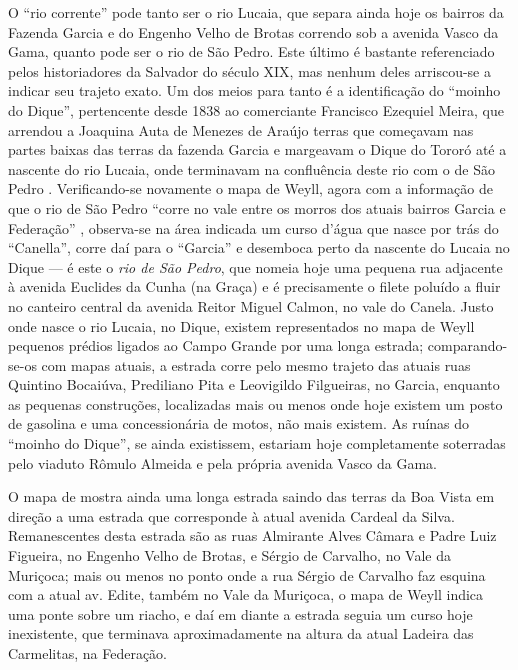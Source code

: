 O ``rio corrente'' pode tanto ser o rio Lucaia, que separa ainda hoje os bairros da Fazenda Garcia e do Engenho Velho de Brotas correndo sob a avenida Vasco da Gama, quanto pode ser o rio de São Pedro. Este último é bastante referenciado pelos historiadores da Salvador do século XIX, mas nenhum deles arriscou-se a indicar seu trajeto exato. Um dos meios para tanto é a identificação do ``moinho do Dique'', pertencente desde 1838 ao comerciante Francisco Ezequiel Meira, que arrendou a Joaquina Auta de Menezes de Araújo terras que começavam nas partes baixas das terras da fazenda Garcia e margeavam o Dique do Tororó até a nascente do rio Lucaia, onde terminavam na confluência deste rio com o de São Pedro \cite[p.~38]{CASTILLO2017}. Verificando-se novamente o mapa de Weyll, agora com a informação de que o rio de São Pedro ``corre no vale entre os morros dos atuais bairros Garcia e Federação'' \cite[p.~39]{CASTILLO2017}, observa-se na área indicada um curso d'água que nasce por trás do ``Canella'', corre daí para o ``Garcia'' e desemboca perto da nascente do Lucaia no Dique --- é este o \textit{rio de São Pedro}, que nomeia hoje uma pequena rua adjacente à avenida Euclides da Cunha (na Graça) e é precisamente o filete poluído a fluir no canteiro central da avenida Reitor Miguel Calmon, no vale do Canela. Justo onde nasce o rio Lucaia, no Dique, existem representados no mapa de Weyll pequenos prédios ligados ao Campo Grande por uma longa estrada; comparando-se-os com mapas atuais, a estrada corre pelo mesmo trajeto das atuais ruas Quintino Bocaiúva, Prediliano Pita e Leovigildo Filgueiras, no Garcia, enquanto as pequenas construções, localizadas mais ou menos onde hoje existem um posto de gasolina e uma concessionária de motos, não mais existem. As ruínas do ``moinho do Dique'', se ainda existissem, estariam hoje completamente soterradas pelo viaduto Rômulo Almeida e pela própria avenida Vasco da Gama.

O mapa de  mostra ainda uma longa estrada saindo das terras da Boa Vista em direção a uma estrada que corresponde à atual avenida Cardeal da Silva. Remanescentes desta estrada são as ruas Almirante Alves Câmara e Padre Luiz Figueira, no Engenho Velho de Brotas, e Sérgio de Carvalho, no Vale da Muriçoca; mais ou menos no ponto onde a rua Sérgio de Carvalho faz esquina com a atual av. Edite, também no Vale da Muriçoca, o mapa de Weyll indica uma ponte sobre um riacho, e daí em diante a estrada seguia um curso hoje inexistente, que terminava aproximadamente na altura da atual Ladeira das Carmelitas, na Federação. 

